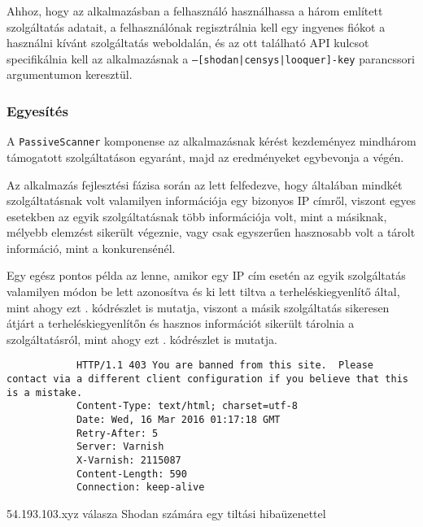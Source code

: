 	Ahhoz, hogy az alkalmazásban a felhasználó használhassa a három említett szolgáltatás adatait, a felhasználónak regisztrálnia kell egy ingyenes fiókot a használni kívánt szolgáltatás weboldalán, és az ott található API kulcsot specifikálnia kell az alkalmazásnak a \texttt{--[shodan|censys|looquer]-key} parancssori argumentumon keresztül.

\subsubsection*{Egyesítés}

	A \texttt{PassiveScanner} komponense az alkalmazásnak kérést kezdeményez mindhárom támogatott szolgáltatáson egyaránt, majd az eredményeket egybevonja a végén.
	
	Az alkalmazás fejlesztési fázisa során az lett felfedezve, hogy általában mindkét szolgáltatásnak volt valamilyen információja egy bizonyos IP címről, viszont egyes esetekben az egyik szolgáltatásnak több információja volt, mint a másiknak, mélyebb elemzést sikerült végeznie, vagy csak egyszerűen hasznosabb volt a tárolt információ, mint a konkurensénél.
	
	Egy egész pontos példa az lenne, amikor egy IP cím esetén az egyik szolgáltatás valamilyen módon be lett azonosítva és ki lett tiltva a terheléskiegyenlítő által, mint ahogy ezt \az{\ref{shodanban_hu}}. kódrészlet is mutatja, viszont a másik szolgáltatás sikeresen átjárt a terheléskiegyenlítőn és hasznos információt sikerült tárolnia a szolgáltatásról, mint ahogy ezt \az{\ref{censysnoban_hu}}. kódrészlet is mutatja.
	
	\begin{listing}[H]
		\begin{verbatim}
			HTTP/1.1 403 You are banned from this site.  Please contact via a different client configuration if you believe that this is a mistake.
			Content-Type: text/html; charset=utf-8
			Date: Wed, 16 Mar 2016 01:17:18 GMT
			Retry-After: 5
			Server: Varnish
			X-Varnish: 2115087
			Content-Length: 590
			Connection: keep-alive
		\end{verbatim}
		\caption{54.193.103.xyz válasza Shodan számára egy tiltási hibaüzenettel}
		\label{shodanban_hu}
	\end{listing}
		
